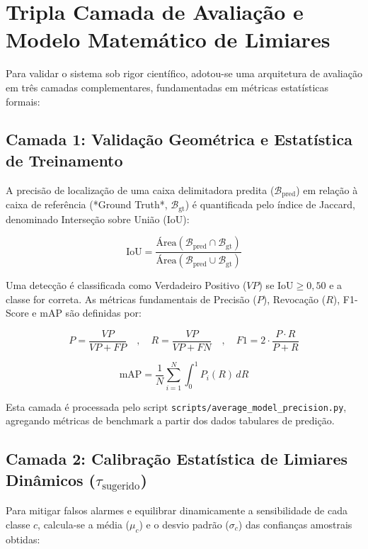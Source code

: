 \section{Tripla Camada de Avaliação e Modelo Matemático de Limiares}
Para validar o sistema sob rigor científico, adotou-se uma arquitetura de avaliação em três camadas complementares, fundamentadas em métricas estatísticas formais:

\subsection{Camada 1: Validação Geométrica e Estatística de Treinamento}
A precisão de localização de uma caixa delimitadora predita ($\mathcal{B}_{\text{pred}}$) em relação à caixa de referência (*Ground Truth*, $\mathcal{B}_{\text{gt}}$) é quantificada pelo índice de Jaccard, denominado Interseção sobre União (IoU):

\begin{equation}
    \text{IoU} = \frac{\text{Área}(\mathcal{B}_{\text{pred}} \cap \mathcal{B}_{\text{gt}})}{\text{Área}(\mathcal{B}_{\text{pred}} \cup \mathcal{B}_{\text{gt}})}
    \label{eq:iou}
\end{equation}

Uma detecção é classificada como Verdadeiro Positivo ($VP$) se $\text{IoU} \ge 0,50$ e a classe for correta. As métricas fundamentais de Precisão ($P$), Revocação ($R$), F1-Score e $\text{mAP}$ são definidas por:

\begin{equation}
    P = \frac{VP}{VP + FP} \quad , \quad R = \frac{VP}{VP + FN} \quad , \quad F1 = 2 \cdot \frac{P \cdot R}{P + R}
    \label{eq:metricas_basicas}
\end{equation}

\begin{equation}
    \text{mAP} = \frac{1}{N} \sum_{i=1}^{N} \int_{0}^{1} P_i(R) \, dR
    \label{eq:map}
\end{equation}

Esta camada é processada pelo script \texttt{scripts/average\_model\_precision.py}, agregando métricas de benchmark a partir dos dados tabulares de predição.

\subsection{Camada 2: Calibração Estatística de Limiares Dinâmicos ($\tau_{\text{sugerido}}$)}
Para mitigar falsos alarmes e equilibrar dinamicamente a sensibilidade de cada classe $c$, calcula-se a média ($\mu_c$) e o desvio padrão ($\sigma_c$) das confianças amostrais obtidas:

